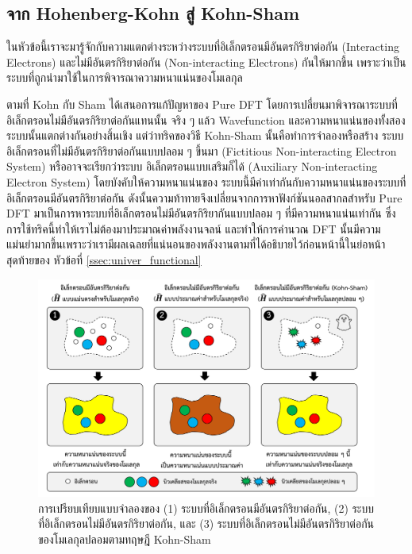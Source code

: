 \subsection{จาก Hohenberg-Kohn สู่ Kohn-Sham}
\label{ssec:from_hk_to_ks}

ในหัวข้อนี้เราจะมารู้จักกับความแตกต่างระหว่างระบบที่อิเล็กตรอนมีอันตรกิริยาต่อกัน (Interacting Electrons) และไม่มีอันตรกิริยาต่อกัน 
(Non-interacting Electrons) กันให้มากขึ้น เพราะว่าเป็นระบบที่ถูกนำมาใช้ในการพิจารณาความหนาแน่นของโมเลกุล

ตามที่ Kohn กับ Sham ได้เสนอการแก้ปัญหาของ Pure DFT โดยการเปลี่ยนมาพิจารณาระบบที่อิเล็กตรอนไม่มีอันตรกิริยาต่อกันแทนนั้น จริง ๆ 
แล้ว Wavefunction และความหนาแน่นของทั้งสองระบบนั้นแตกต่างกันอย่างสิ้นเชิง แต่ว่าทริคของวิธี Kohn-Sham นั้นคือทำการจำลองหรือสร้าง%
ระบบอิเล็กตรอนที่ไม่มีอันตรกิริยาต่อกันแบบปลอม ๆ ขึ้นมา (Fictitious Non-interacting Electron System) หรืออาจจะเรียกว่าระบบ%
อิเล็กตรอนแบบเสริมก็ได้ (Auxiliary Non-interacting Electron System)\autocite{martin2020} โดยบังคับให้ความหนาแน่นของ%
ระบบนี้มีค่าเท่ากันกับความหนาแน่นของระบบที่อิเล็กตรอนมีอันตรกิริยาต่อกัน ดังนั้นความท้าทายจึงเปลี่ยนจากการหาฟังก์ชันนอลสากลสำหรับ Pure DFT 
มาเป็นการหาระบบที่อิเล็กตรอนไม่มีอันตรกิริยากันแบบปลอม ๆ ที่มีความหนาแน่นเท่ากัน ซึ่งการใช้ทริคนี้ทำให้เราไม่ต้องมาประมาณค่าพลังงานจลน์%
และทำให้การคำนวณ DFT นั้นมีความแม่นยำมากขึ้นเพราะว่าเรามีผลเฉลยที่แน่นอนของพลังงานตามที่ได้อธิบายไว้ก่อนหน้านี้ในย่อหน้าสุดท้ายของ%
หัวข้อที่ \ref{ssec:univer_functional}

\begin{figure}[htbp]
    \centering
    \includegraphics[width=\linewidth]{fig/electron_system.png}
    \caption{การเปรียบเทียบแบบจำลองของ (1) ระบบที่อิเล็กตรอนมีอันตรกิริยาต่อกัน, (2) ระบบที่อิเล็กตรอนไม่มีอันตรกิริยาต่อกัน, และ 
    (3) ระบบที่อิเล็กตรอนไม่มีอันตรกิริยาต่อกันของโมเลกุลปลอมตามทฤษฎี Kohn-Sham}
    \label{fig:electron_system}
\end{figure}

